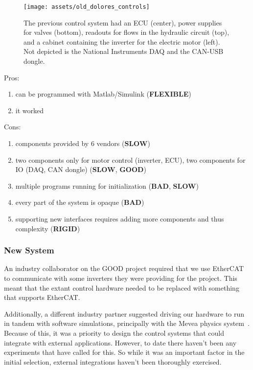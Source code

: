 \documentclass[english,12pt,a4paper,pdftex,eng,utf8]{aaltothesis}
\begin{document}
\begin{figure}[h]
	\centering
	\texttt{[image: assets/old\_dolores\_controls]}
	\caption{The previous control system had an ECU (center), power supplies for valves (bottom), readouts for flows in the hydraulic circuit (top), and a cabinet containing the inverter for the electric motor (left).  Not depicted is the National Instruments DAQ and the CAN-USB dongle.}\label{fig:dolores_old_system}
\end{figure}

Pros:
\begin{enumerate}
	\item can be programmed with Matlab/Simulink (\textbf{FLEXIBLE})
	\item it worked
\end{enumerate}

Cons:
\begin{enumerate}
	\item components provided by 6 vendors (\textbf{SLOW})
	\item two components only for motor control (inverter, ECU), two components for IO (DAQ, CAN dongle) (\textbf{SLOW}, \textbf{GOOD})
	\item multiple programs running for initialization (\textbf{BAD}, \textbf{SLOW})
	\item every part of the system is opaque (\textbf{BAD})
	\item supporting new interfaces requires adding more components and thus complexity (\textbf{RIGID})
\end{enumerate}

\subsubsection{New System}

An industry collaborator on the GOOD project required that we use EtherCAT~\cite{Andreeva2023} to communicate with some inverters they were providing for the project.  This meant that the extant control hardware needed to be replaced with something that supports EtherCAT.

Additionally, a different industry partner suggested driving our hardware to run in tandem with software simulations, principally with the Mevea physics system~\cite{MeveaSoftware}.  Because of this, it was a priority to design the control systems that could integrate with external applications.  However, to date there haven't been any experiments that have called for this.  So while it was an important factor in the initial selection, external integrations haven't been thoroughly exercised.
\end{document}
